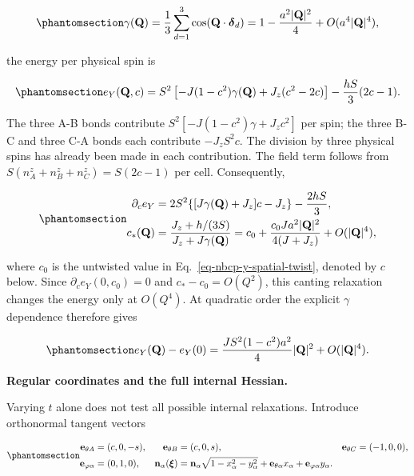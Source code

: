 \begin{equation}\phantomsection\label{eq-nbcp-y-twist-structure-factor}{
\gamma(\mathbf Q)=\frac13\sum_{d=1}^3
\cos(\mathbf Q\cdot\boldsymbol\delta_d)
=1-\frac{a^2|\mathbf Q|^2}{4}
+O(a^4|\mathbf Q|^4),
}\end{equation}

the energy per physical spin is

\begin{equation}\phantomsection\label{eq-nbcp-y-twisted-energy}{
e_Y(\mathbf Q,c)=S^2\left[
-J(1-c^2)\gamma(\mathbf Q)+J_z(c^2-2c)\right]
-\frac{hS}{3}(2c-1).
}\end{equation}

The three A-B bonds contribute \(S^2[-J(1-c^2)\gamma+J_zc^2]\) per spin;
the three B-C and three C-A bonds each contribute \(-J_zS^2c\). The
division by three physical spins has already been made in each
contribution. The field term follows from
\(S(n_A^z+n_B^z+n_C^z)=S(2c-1)\) per cell. Consequently,

\begin{equation}\phantomsection\label{eq-nbcp-y-canting-relaxation}{
\begin{aligned}
\partial_c e_Y&=2S^2\{[J\gamma(\mathbf Q)+J_z]c-J_z\}
-\frac{2hS}{3},\\
c_*(\mathbf Q)&=\frac{J_z+h/(3S)}{J_z+J\gamma(\mathbf Q)}
=c_0+\frac{c_0Ja^2|\mathbf Q|^2}{4(J+J_z)}+O(|\mathbf Q|^4),
\end{aligned}
}\end{equation}

where \(c_0\) is the untwisted value in
Eq.~\ref{eq-nbcp-y-spatial-twist}, denoted by \(c\) below. Since
\(\partial_c e_Y(0,c_0)=0\) and \(c_*-c_0=O(Q^2)\), this canting
relaxation changes the energy only at \(O(Q^4)\). At quadratic order the
explicit \(\gamma\) dependence therefore gives

\begin{equation}\phantomsection\label{eq-nbcp-y-twist-cost}{
e_Y(\mathbf Q)-e_Y(0)
=\frac{JS^2(1-c^2)a^2}{4}|\mathbf Q|^2
+O(|\mathbf Q|^4).
}\end{equation}

\textbf{Regular coordinates and the full internal Hessian.}

Varying \(t\) alone does not test all possible internal relaxations.
Introduce orthonormal tangent vectors

\begin{equation}\phantomsection\label{eq-nbcp-y-regular-tangents}{
\begin{aligned}
\mathbf e_{\theta A}&=(c,0,-s),&
\mathbf e_{\theta B}&=(c,0,s),&
\mathbf e_{\theta C}&=(-1,0,0),\\
\mathbf e_{\varphi\alpha}&=(0,1,0),&
\mathbf n_\alpha(\boldsymbol\xi)&=
\mathbf n_\alpha\sqrt{1-x_\alpha^2-y_\alpha^2}
+\mathbf e_{\theta\alpha}x_\alpha+\mathbf e_{\varphi\alpha}y_\alpha.
\end{aligned}
}\end{equation}

